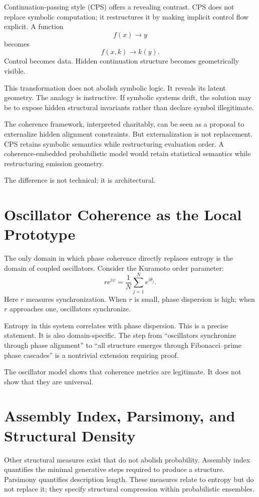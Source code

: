 \documentclass[12pt]{article}
\begin{document}
Continuation-passing style (CPS) offers a revealing contrast. CPS does not replace symbolic computation; it restructures it by making implicit control flow explicit. A function
\[
  f(x) \to y
\]
becomes
\[
  f(x, k) \to k(y).
\]
Control becomes data. Hidden continuation structure becomes geometrically visible.

This transformation does not abolish symbolic logic. It reveals its latent geometry. The analogy is instructive. If symbolic systems drift, the solution may be to expose hidden structural invariants rather than declare symbol illegitimate.

The coherence framework, interpreted charitably, can be seen as a proposal to externalize hidden alignment constraints. But externalization is not replacement. CPS retains symbolic semantics while restructuring evaluation order. A coherence-embedded probabilistic model would retain statistical semantics while restructuring emission geometry.

The difference is not technical; it is architectural.

\section{Oscillator Coherence as the Local Prototype}

The only domain in which phase coherence directly replaces entropy is the domain of coupled oscillators. Consider the Kuramoto order parameter:
\[
  r e^{i\psi} = \frac{1}{N}\sum_{j=1}^N e^{i\theta_j}.
\]
Here $r$ measures synchronization. When $r$ is small, phase dispersion is high; when $r$ approaches one, oscillators synchronize.

Entropy in this system correlates with phase dispersion. This is a precise statement. It is also domain-specific. The step from ``oscillators synchronize through phase alignment'' to ``all structure emerges through Fibonacci–prime phase cascades'' is a nontrivial extension requiring proof.

The oscillator model shows that coherence metrics are legitimate. It does not show that they are universal.

\section{Assembly Index, Parsimony, and Structural Density}

Other structural measures exist that do not abolish probability. Assembly index quantifies the minimal generative steps required to produce a structure. Parsimony quantifies description length. These measures relate to entropy but do not replace it; they specify structural compression within probabilistic ensembles.
\end{document}
